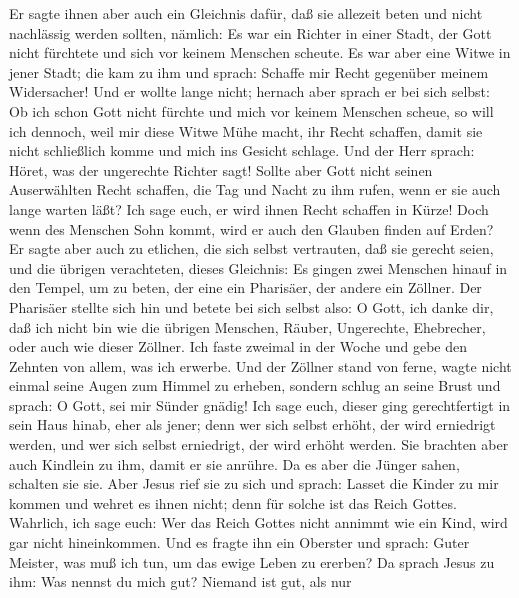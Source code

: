  Er sagte ihnen aber auch ein Gleichnis dafür, daß sie
allezeit beten und nicht nachlässig werden sollten, 
nämlich: Es war ein Richter in einer Stadt, der Gott nicht fürchtete und
sich vor keinem Menschen scheute.  Es war aber eine Witwe
in jener Stadt; die kam zu ihm und sprach: Schaffe mir Recht gegenüber
meinem Widersacher!  Und er wollte lange nicht; hernach
aber sprach er bei sich selbst: Ob ich schon Gott nicht fürchte und mich
vor keinem Menschen scheue,  so will ich dennoch, weil mir
diese Witwe Mühe macht, ihr Recht schaffen, damit sie nicht schließlich
komme und mich ins Gesicht schlage.  Und der Herr sprach:
Höret, was der ungerechte Richter sagt!  Sollte aber Gott
nicht seinen Auserwählten Recht schaffen, die Tag und Nacht zu ihm
rufen, wenn er sie auch lange warten läßt?  Ich sage euch,
er wird ihnen Recht schaffen in Kürze! Doch wenn des Menschen Sohn
kommt, wird er auch den Glauben finden auf Erden?  Er
sagte aber auch zu etlichen, die sich selbst vertrauten, daß sie gerecht
seien, und die übrigen verachteten, dieses Gleichnis:  Es
gingen zwei Menschen hinauf in den Tempel, um zu beten, der eine ein
Pharisäer, der andere ein Zöllner.  Der Pharisäer stellte
sich hin und betete bei sich selbst also: O Gott, ich danke dir, daß ich
nicht bin wie die übrigen Menschen, Räuber, Ungerechte, Ehebrecher, oder
auch wie dieser Zöllner.  Ich faste zweimal in der Woche
und gebe den Zehnten von allem, was ich erwerbe.  Und der
Zöllner stand von ferne, wagte nicht einmal seine Augen zum Himmel zu
erheben, sondern schlug an seine Brust und sprach: O Gott, sei mir
Sünder gnädig!  Ich sage euch, dieser ging gerechtfertigt
in sein Haus hinab, eher als jener; denn wer sich selbst erhöht, der
wird erniedrigt werden, und wer sich selbst erniedrigt, der wird erhöht
werden.  Sie brachten aber auch Kindlein zu ihm, damit er
sie anrühre. Da es aber die Jünger sahen, schalten sie sie.
 Aber Jesus rief sie zu sich und sprach: Lasset die
Kinder zu mir kommen und wehret es ihnen nicht; denn für solche ist das
Reich Gottes.  Wahrlich, ich sage euch: Wer das Reich
Gottes nicht annimmt wie ein Kind, wird gar nicht hineinkommen.
 Und es fragte ihn ein Oberster und sprach: Guter
Meister, was muß ich tun, um das ewige Leben zu ererben? 
Da sprach Jesus zu ihm: Was nennst du mich gut? Niemand ist gut, als nur
